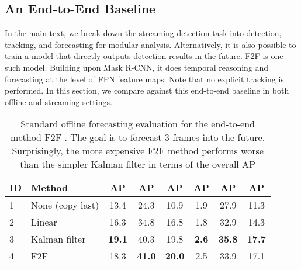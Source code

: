 \subsection{An End-to-End Baseline}
\label{app:e2ebaseline}

In the main text, we break down the streaming detection task into detection, tracking, and forecasting for modular analysis. Alternatively, it is also possible to train a model that directly outputs detection results in the future. F2F \cite{Luc2018PredictingFI} is one such model. Building upon Mask R-CNN, it does temporal reasoning and forecasting at the level of FPN feature maps. Note that no explicit tracking is performed. In this section, we compare against this end-to-end baseline in both offline and streaming settings.

\begin{table*}[]
\small
\centering
\caption{Standard offline forecasting evaluation for the end-to-end method F2F \cite{Luc2018PredictingFI}. The goal is to forecast 3 frames into the future. Surprisingly, the more expensive F2F method performs worse than the simpler Kalman filter in terms of the overall AP}
\label{tab:f2foffline}
\begin{tabular}{llcccccc}
\toprule
ID & Method                                             & AP            & AP         & AP        & AP        & AP        & AP       \\
\midrule
1  & None (copy last) & 13.4          & 24.3          & 10.9          & 1.9          & 27.9          & 11.3          \\
2  & Linear           & 16.3          & 34.8          & 16.8          & 1.8          & 32.9          & 14.3          \\
3  & Kalman filter    & \textbf{19.1} & 40.3          & 19.8          & \textbf{2.6} & \textbf{35.8}          & \textbf{17.7} \\
4  & F2F              & 18.3          & \textbf{41.0} & \textbf{20.0} & 2.5          & 33.9 & 17.1     \\
\bottomrule
\end{tabular}
\end{table*}


